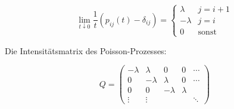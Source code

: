 \vspace*{-4mm}
$$\lim_{t\downarrow0} \frac{1}{t} (p_{ij}(t) - \delta_{ij}) = \begin{cases} \lambda & j = i+1 \\ -\lambda & j=i \\ 0 & \text{sonst}\end{cases}$$

Die Intensitätsmatrix des Poisson-Prozesses:

$$Q = \begin{pmatrix} -\lambda & \lambda & 0 & 0 & \cdots \\ 0 & -\lambda & \lambda & 0 & \cdots \\ 0 & 0 & -\lambda & \lambda & \\ \vdots & \vdots & & & \ddots \end{pmatrix}$$
